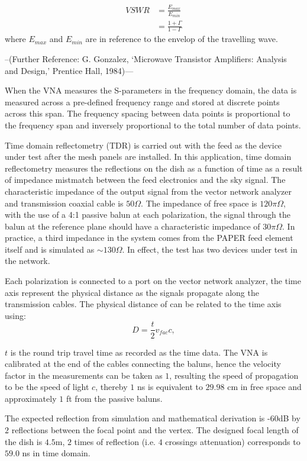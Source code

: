 \documentclass[preprint]{aastex}  %
\begin{document}
\begin{align}
VSWR & = \frac{E_{max}}{E_{min}} \nonumber \\
&	 = \frac{1+\Gamma}{1-\Gamma}
\end{align}
where $E_{max}$ and $E_{min}$ are in reference to the envelop of the travelling 
wave. 

--(Further Reference: G. Gonzalez, ‘Microwave Transistor Amplifiers: Analysis and Design,’ Prentice Hall, 1984)---

When the VNA measures the S-parameters in the frequency domain, the data is 
measured across a pre-defined frequency range and stored at discrete points 
across this span. The frequency spacing between data points is proportional to 
the frequency span and inversely proportional to the total number of data points.

Time domain reflectometry (TDR) is carried out with the feed as the device 
under test after the mesh panels are installed. In this application, time 
domain reflectometry measures the reflections on the dish as a function of time 
as a result of impedance mistmatch between the feed electronics and the sky 
signal. The characteristic impedance of the output signal from the vector network analyzer and transmission coaxial cable is $50\Omega$. The impedance of free space is $120\pi\Omega$, with the use of a 4:1 passive balun at each polarization, the signal through the balun at the reference plane should have a characteristic impedance of $30\pi\Omega$. In practice, a third impedance in the system comes from the PAPER feed element itself and is simulated as $\sim130\Omega$. In effect, the test has two devices under test in the network.

Each polarization is connected to a port on the vector network analyzer, the time axis represent the physical distance as the signals propagate along the transmission cables. The physical distance of can be related to the time axis using:
\begin{equation}
D = \frac{t}{2}v_{fac}c,
\end{equation}

$t$ is the round trip travel time as recorded as the time data.
The VNA is calibrated at the end of the cables connecting the baluns, hence the 
velocity factor in the measurements can be taken as $1$, resulting the speed of 
propagation to be the speed of light $c$, thereby $1$ ns is equivalent to $29.98$ cm in free space and approximately $1$ ft from the passive baluns.

The expected reflection from simulation and mathematical derivation is -$60$dB by $2$ reflections between the focal point and the vertex. The designed focal length of the dish is $4.5$m, $2$ times of reflection (i.e. $4$ crossings attenuation) corresponds to $59.0$ ns in time domain.
\end{document}
